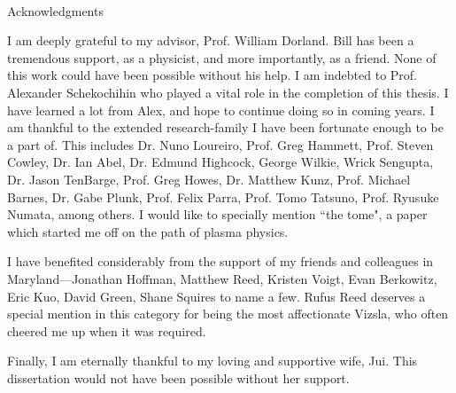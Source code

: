 
\renewcommand{\baselinestretch}{2}
\small\normalsize
\hbox{\ }
 
\vspace{-.65in}

\begin{center}
\large{Acknowledgments} 
\end{center} 

I am deeply grateful to my advisor, Prof. William Dorland. Bill has been a tremendous
support, as a physicist, and more importantly, as a friend. None of this work could have
been possible without his help. I am indebted to Prof. Alexander Schekochihin who played a
vital role in the completion of this thesis. I have learned a lot from Alex, and hope to
continue doing so in coming years. I am thankful to the extended research-family I have been fortunate enough to be a part of. This includes Dr. Nuno Loureiro, Prof.
Greg Hammett, Prof. Steven Cowley, Dr. Ian Abel, Dr. Edmund Highcock, George Wilkie, Wrick Sengupta,
Dr. Jason TenBarge, Prof.
Greg Howes, Dr. Matthew Kunz, Prof. Michael Barnes, Dr. Gabe Plunk, Prof. Felix Parra, Prof. Tomo Tatsuno,
Prof. Ryusuke Numata, among others. I would like to specially mention ``the
tome"\cite{tome}, a paper which started me off on the path of plasma physics.

I have benefited considerably from the support of my friends and colleagues in
Maryland---Jonathan Hoffman, Matthew Reed, Kristen Voigt, Evan Berkowitz, Eric Kuo, David
Green, Shane Squires to name a few. Rufus Reed deserves a special mention in this category
for being the most affectionate Vizsla, who often cheered me up when it was required.

Finally, I am eternally thankful to my loving and supportive wife, Jui. This dissertation
would not have been possible without her support.

\vspace{1ex}

